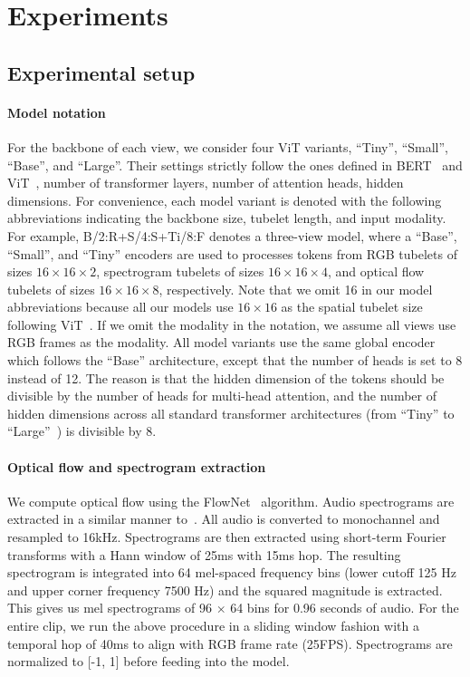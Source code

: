 \section{Experiments}
\subsection{Experimental setup}
\paragraph{Model notation} For the backbone of each view, we consider four ViT variants, ``Tiny'', ``Small'', ``Base'', and ``Large''. Their settings strictly follow the ones defined in BERT~\cite{devlin_naacl_2019} and ViT~\cite{dosovitskiy2020image}, \ie number of transformer layers, number of attention heads, hidden dimensions.
For convenience, each model variant is denoted with the following abbreviations indicating the backbone size, tubelet length, and input modality.
For example, B/2:R+S/4:S+Ti/8:F denotes a three-view model, where a ``Base'', ``Small'', and ``Tiny'' encoders are used to processes tokens from RGB tubelets of sizes $16\times16\times2$, spectrogram tubelets of sizes $16\times16\times4$, and optical flow tubelets of sizes $16\times16\times8$, respectively.
Note that we omit 16 in our model abbreviations because all our models use $16\times16$ as the spatial tubelet size following ViT~\cite{dosovitskiy2020image}. If we omit the modality in the notation, we assume all views use RGB frames as the modality.
All model variants use the same global encoder which follows the ``Base'' architecture, except that the number of heads is set to 8 instead of 12. The reason is that the hidden dimension of the tokens should be divisible by the number of heads for multi-head attention, and the number of hidden dimensions across all standard transformer architectures (from ``Tiny'' to ``Large''~\cite{steiner2021augreg, dosovitskiy2020image}) is divisible by 8.

\paragraph{Optical flow and spectrogram extraction} 
We compute optical flow using the FlowNet~\cite{dosovitskiy2015flownet} algorithm. Audio spectrograms are extracted in a similar manner to~\cite{hershey2017cnn}. All audio is converted to monochannel and resampled to 16kHz. Spectrograms are then extracted using short-term Fourier transforms with a Hann window of 25ms with 15ms hop. The resulting spectrogram is integrated into
64 mel-spaced frequency bins (lower cutoff 125 Hz and upper corner frequency 7500 Hz) and the squared magnitude is extracted. This gives us mel spectrograms of 96 $\times$ 64 bins for 0.96 seconds of audio. For the entire clip, we run the above procedure in a sliding window fashion with a temporal hop of 40ms to align with RGB frame rate (25FPS). Spectrograms are normalized to [-1, 1] before feeding into the model.


